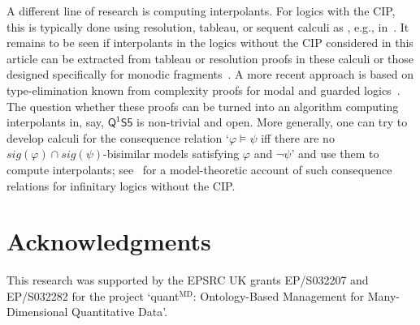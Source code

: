 \documentclass{lmcs} %
\theoremstyle{plain}\newtheorem{satz}[thm]{Satz} %
\newcommand{\sig}{\mathit{sig}}
\newcommand{\FOMS}{\ensuremath{\mathsf{Q^1S5}}}
\begin{document}
A different line of research is computing interpolants. For logics with the CIP, this is typically done using resolution, tableau, or sequent calculi as , e.g., in~\cite{DBLP:books/daglib/0082098,DBLP:conf/lpar/KovacsV17,DBLP:journals/apal/Kuznets18,DBLP:journals/jar/Wernhard21}. It remains to be seen if interpolants in the logics without the CIP considered in this article can be extracted from tableau or resolution proofs in these calculi or those designed specifically for monodic fragments~\cite{DBLP:conf/cade/LutzSWZ01,DBLP:journals/sLogica/LutzSWZ02,DBLP:journals/tocl/DegtyarevFK06}. A more recent approach is based on type-elimination known from complexity proofs for modal and guarded logics~\cite{DBLP:journals/tocl/BenediktCB16,baldernote}. The question whether these proofs can be turned into an algorithm computing interpolants in, say, \FOMS{} is non-trivial and open. More generally, one can try to develop calculi for the consequence relation `$\varphi \models \psi$ iff there are no $\sig(\varphi)\cap\sig(\psi)$-bisimilar models satisfying $\varphi$ and $\neg \psi$' and use them to compute interpolants; see~\cite{DBLP:journals/jsyml/BarwiseB99} for a model-theoretic account of such consequence relations for infinitary logics without the CIP. 

\section*{Acknowledgments}

This research was supported by the EPSRC UK grants EP/S032207 and EP/S032282 for the project `quant$^\text{MD}$: Ontology-Based Management for Many-Dimensional Quantitative Data'\!.


\end{document}
